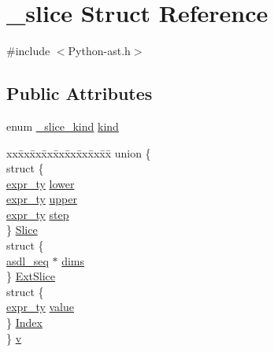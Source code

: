 \hypertarget{struct__slice}{}\section{\+\_\+slice Struct Reference}
\label{struct__slice}


{\ttfamily \#include $<$Python-\/ast.\+h$>$}

\subsection*{Public Attributes}
\begin{DoxyCompactItemize}
\item 
enum \mbox{\hyperlink{_python-ast_8h_aca2c61e8b8abfd4a29eda6a47f491fcb}{\+\_\+slice\+\_\+kind}} \mbox{\hyperlink{struct__slice_a9db6ac61022be11837644803e62dbae3}{kind}}
\item 
\begin{tabbing}
xx\=xx\=xx\=xx\=xx\=xx\=xx\=xx\=xx\=\kill
union \{\\
\>struct \{\\
\>\>\mbox{\hyperlink{_python-ast_8h_a56d3705e020a071405094a220c4592bd}{expr\_ty}} \mbox{\hyperlink{struct__slice_a6f093b55e957623c74a6331d8f937500}{lower}}\\
\>\>\mbox{\hyperlink{_python-ast_8h_a56d3705e020a071405094a220c4592bd}{expr\_ty}} \mbox{\hyperlink{struct__slice_a9535a1f77a13185667a1be7eacd5f557}{upper}}\\
\>\>\mbox{\hyperlink{_python-ast_8h_a56d3705e020a071405094a220c4592bd}{expr\_ty}} \mbox{\hyperlink{struct__slice_ace8e2eccc20477db2a1ac90d267154b2}{step}}\\
\>\} \mbox{\hyperlink{struct__slice_a3ced7266b77b6f06f45a30747fa88e76}{Slice}}\\
\>struct \{\\
\>\>\mbox{\hyperlink{structasdl__seq}{asdl\_seq}} $\ast$ \mbox{\hyperlink{struct__slice_a93030a4ad534e07757aee5a01339c4e1}{dims}}\\
\>\} \mbox{\hyperlink{struct__slice_a742c6e26c3e02b543c1f40aa4bd47020}{ExtSlice}}\\
\>struct \{\\
\>\>\mbox{\hyperlink{_python-ast_8h_a56d3705e020a071405094a220c4592bd}{expr\_ty}} \mbox{\hyperlink{struct__slice_af026e3a8887c949516ce9a869cf73fb4}{value}}\\
\>\} \mbox{\hyperlink{struct__slice_a5c77aabc98d3024ed8af2781d6cdfcf2}{Index}}\\
\} \mbox{\hyperlink{struct__slice_a60bb76561c60164951048efe2222a44e}{v}}\\

\end{tabbing}\end{DoxyCompactItemize}


